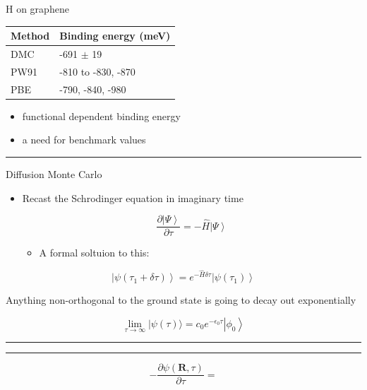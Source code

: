 \documentclass[
  letterpaper,
  DIV=11,
  numbers=noendperiod]{scrartcl}
\providecommand{\tightlist}{%
  \setlength{\itemsep}{0pt}\setlength{\parskip}{0pt}}\usepackage{longtable,booktabs,array}
\begin{document}
H on graphene

\begin{longtable}[]{@{}ll@{}}
\toprule()
Method & Binding energy (meV) \\
\midrule()
\endhead
DMC & -691 \(\pm\) 19 \\
PW91 & -810 to -830, -870 \\
PBE & -790, -840, -980 \\
\bottomrule()
\end{longtable}

\begin{itemize}
\tightlist
\item
  functional dependent binding energy
\item
  a need for benchmark values
\end{itemize}

\begin{center}\rule{0.5\linewidth}{0.5pt}\end{center}

Diffusion Monte Carlo

\begin{itemize}
\item
  Recast the Schrodinger equation in imaginary time

  \[\frac{\partial \left|\Psi\right>}{\partial \tau} = - \hat{H} \left|\Psi\right> \]

  \begin{itemize}
  \tightlist
  \item
    A formal soltuion to this:
  \end{itemize}
\end{itemize}

\[\left|\psi\left(\tau_{1}+\delta \tau\right)\right\rangle=e^{-\hat{H} \delta \tau}\left|\psi\left(\tau_{1}\right)\right\rangle\]

Anything non-orthogonal to the ground state is going to decay out
exponentially

\[\lim _{\tau \rightarrow \infty}|\psi(\tau)\rangle=c_{0} e^{-\epsilon_{0} \tau}\left|\phi_{0}\right\rangle\]

\begin{center}\rule{0.5\linewidth}{0.5pt}\end{center}

\begin{center}\rule{0.5\linewidth}{0.5pt}\end{center}

\[ -\frac{\partial \psi(\mathbf{R}, \tau)}{\partial \tau} = \]
\end{document}
